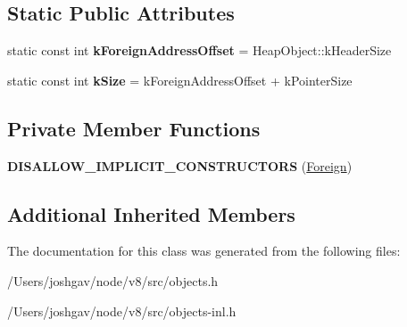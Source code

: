 \subsection*{Static Public Attributes}
\begin{DoxyCompactItemize}
\item 
static const int {\bfseries k\+Foreign\+Address\+Offset} = Heap\+Object\+::k\+Header\+Size\hypertarget{classv8_1_1internal_1_1_foreign_af4241dc31655e2432335e9c5e9de11ff}{}\label{classv8_1_1internal_1_1_foreign_af4241dc31655e2432335e9c5e9de11ff}

\item 
static const int {\bfseries k\+Size} = k\+Foreign\+Address\+Offset + k\+Pointer\+Size\hypertarget{classv8_1_1internal_1_1_foreign_a4c89f141a3a79948c4f3b078cf6688cf}{}\label{classv8_1_1internal_1_1_foreign_a4c89f141a3a79948c4f3b078cf6688cf}

\end{DoxyCompactItemize}
\subsection*{Private Member Functions}
\begin{DoxyCompactItemize}
\item 
{\bfseries D\+I\+S\+A\+L\+L\+O\+W\+\_\+\+I\+M\+P\+L\+I\+C\+I\+T\+\_\+\+C\+O\+N\+S\+T\+R\+U\+C\+T\+O\+RS} (\hyperlink{classv8_1_1internal_1_1_foreign}{Foreign})\hypertarget{classv8_1_1internal_1_1_foreign_a9ee2a66e2af12b7cbfd674eca6fc7385}{}\label{classv8_1_1internal_1_1_foreign_a9ee2a66e2af12b7cbfd674eca6fc7385}

\end{DoxyCompactItemize}
\subsection*{Additional Inherited Members}


The documentation for this class was generated from the following files\+:\begin{DoxyCompactItemize}
\item 
/\+Users/joshgav/node/v8/src/objects.\+h\item 
/\+Users/joshgav/node/v8/src/objects-\/inl.\+h\end{DoxyCompactItemize}
